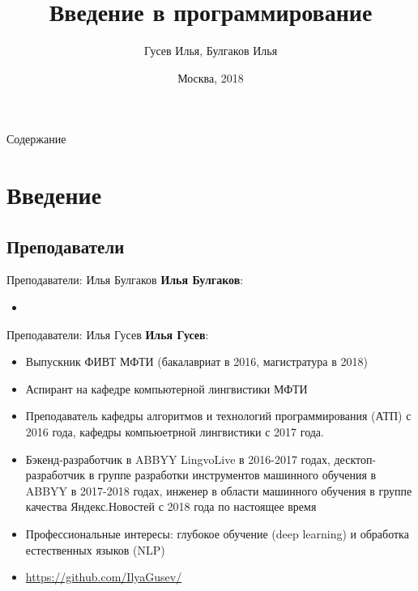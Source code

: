 \documentclass[10pt]{beamer}
\title[\href{https://goo.gl/NRgp8K}{https://goo.gl/NRgp8K} (Term 1)]{Введение в программирование}
\author[Гусев Илья, Булгаков Илья]{Гусев Илья, Булгаков Илья}
\institute[МФТИ] 
{Московский физико-технический институт\\*}
\date{Москва, 2018}
\begin{document}
\begin{frame}
  \titlepage
\end{frame}

\begin{frame}{Содержание}
\tableofcontents
\end{frame}

\section{Введение}

\subsection{Преподаватели}

\begin{frame}{Преподаватели: Илья Булгаков}
\textbf{Илья Булгаков}:
\begin{itemize}
    \item 
\end{itemize}
\end{frame}

\begin{frame}{Преподаватели: Илья Гусев}
\textbf{Илья Гусев}:
\begin{itemize}
    \item Выпускник ФИВТ МФТИ (бакалавриат в 2016, магистратура в 2018)
    \item Аспирант на кафедре компьютерной лингвистики МФТИ
    \item Преподаватель кафедры алгоритмов и технологий программирования (АТП) с 2016 года, кафедры компьюетрной лингвистики с 2017 года.
    \item Бэкенд-разработчик в ABBYY LingvoLive в 2016-2017 годах, десктоп-разработчик в группе разработки инструментов машинного обучения в ABBYY в 2017-2018 годах, инженер в области машинного обучения в группе качества Яндекс.Новостей с 2018 года по настоящее время
    \item Профессиональные интересы: глубокое обучение (deep learning) и обработка естественных языков (NLP)
    \item \href{https://github.com/IlyaGusev/}{https://github.com/IlyaGusev/}
\end{itemize}
\end{frame}
\end{document}
